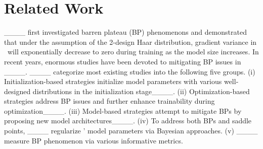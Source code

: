\section{Related Work}
\label{sec:rewk}
____ first investigated barren plateau (BP) phenomenons and demonstrated that under the assumption of the 2-design Haar distribution, gradient variance in \qnns\ will exponentially decrease to zero during training as the model size increases. In recent years, enormous studies have been devoted to mitigating BP issues in \qnns____. ____ categorize most existing studies into the following five groups.
(i) Initialization-based strategies initialize model parameters with various well-designed distributions in the initialization stage____.
(ii) Optimization-based strategies address BP issues and further enhance trainability during optimization____. %
(iii) Model-based strategies attempt to mitigate BPs by proposing new model architectures____. %
(iv) To address both BPs and saddle points, ____ regularize \qnns' model parameters via Bayesian approaches.
(v) ____ measure BP phenomenon via various informative metrics.